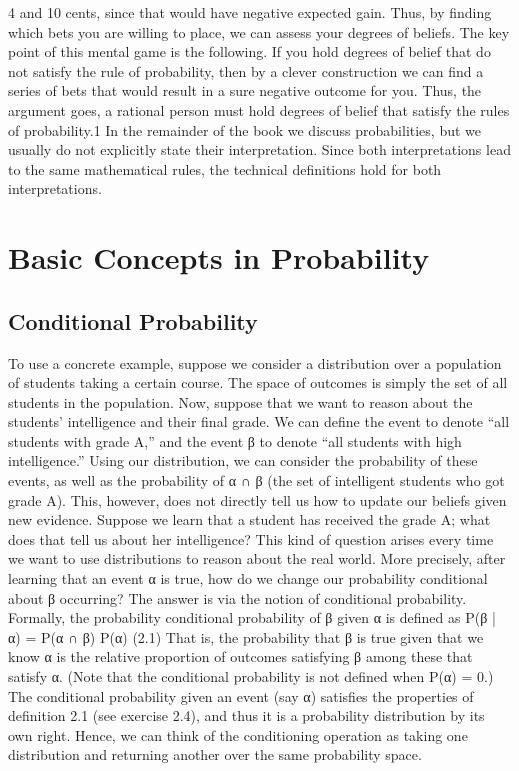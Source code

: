     4 and 10 cents, since that would have negative expected gain. Thus, by finding which bets you are willing to place, we can assess your degrees of beliefs. The key point of this mental game is the following. If you hold degrees of belief that do not satisfy the rule of probability, then by a clever construction we can find a series of bets that would result in a sure negative outcome for you. Thus, the argument goes, a rational person must hold degrees of belief that satisfy the rules of probability.1 In the remainder of the book we discuss probabilities, but we usually do not explicitly state their interpretation. Since both interpretations lead to the same mathematical rules, the technical definitions hold for both interpretations.

\section{Basic Concepts in Probability}

\subsection{Conditional Probability}

To use a concrete example, suppose we consider a distribution over a population of students taking a certain course. The space of outcomes is simply the set of all students in the population. Now, suppose that we want to reason about the students’ intelligence and their final grade. We can define the event \alpha to denote “all students with grade A,” and the event β to denote “all students with high intelligence.” Using our distribution, we can consider the probability of these events, as well as the probability of α ∩ β (the set of intelligent students who got grade A). This, however, does not directly tell us how to update our beliefs given new evidence. Suppose we learn that a student has received the grade A; what does that tell us about her intelligence? This kind of question arises every time we want to use distributions to reason about the real world. More precisely, after learning that an event α is true, how do we change our probability conditional about β occurring? The answer is via the notion of conditional probability. Formally, the probability conditional probability of β given α is defined as P(β | α) = P(α ∩ β) P(α) (2.1) That is, the probability that β is true given that we know α is the relative proportion of outcomes satisfying β among these that satisfy α. (Note that the conditional probability is not defined when P(α) = 0.) The conditional probability given an event (say α) satisfies the properties of definition 2.1 (see exercise 2.4), and thus it is a probability distribution by its own right. Hence, we can think of the conditioning operation as taking one distribution and returning another over the same probability space.


